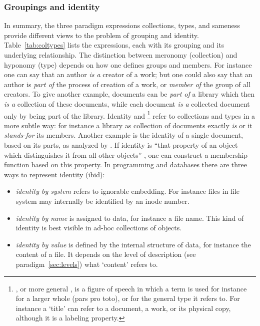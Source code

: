 \subsubsection{Groupings and identity}

In summary, the three paradigm expressions collections, types, and sameness provide
different views to the problem of grouping and identity. Table~\ref{tab:coltypes} 
lists the expressions, each with its grouping  and its
underlying relationship.  The distinction between meronomy (collection) and 
hyponomy (type) depends on how one defines groups and members. For instance one can say that an
author \emph{is a} creator of a work; but one could also say that an author is
\emph{part of} the process of creation of a work, or \emph{member of} the group
of all creators. To give another example, documents can be \emph{part of} a
library which then \emph{is a} collection of these documents, while each
document \emph{is a} collected document only by being part of the library.
Identity and \footnote{ , or more general
, is a figure of speech in which a term is used for instance for
a larger whole (pars pro toto), or for the general type it refers to. For
instance a `title' can refer to a document, a work, or its physical copy,
although it is a labeling property.} refer to collections and types in a more
subtle way: for instance a library as collection of documents exactly \emph{is}
or it \emph{stands-for} its members. Another example is the identity of a single
document, based on its parts, as analyzed by \textcite{Renear2003}. If
identity is ``that property of an object which distinguishes it from all other
objects'' \cite{Khoshafian1986}, one can construct a membership function based
on this property. In programming and databases there are three ways to
represent identity (ibid):

\begin{itemize}
\item {\em identity by system} refers to ignorable embedding. For instance 
  files in file system may internally be identified by an inode number.
\item {\em identity by name} is assigned to data, for instance a file name.
  This kind of identity is best visible in ad-hoc collections of objects.
\item {\em identity by value} is defined by the internal structure of data, for
  instance the content of a file. It depends on the level of description 
  (see paradigm~\ref{sec:levels}) what `content' refers to.
\end{itemize}

